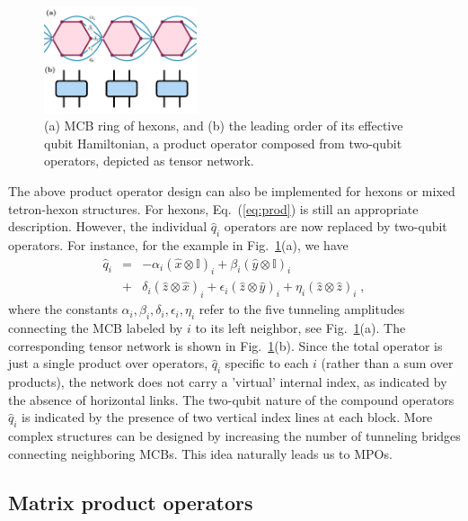 \documentclass[twocolumn,floats,prx,showpacs]{revtex4-1}
\newcommand{\id}{\mathbb{I}}
\def\id{\mathbb{I}}
\begin{document}
\begin{figure}
\includegraphics[width=0.4\textwidth]{fig/hexon_prod.pdf}
\caption{(a) MCB ring of hexons, and (b) the leading order of its effective qubit Hamiltonian, a product operator composed from two-qubit operators, depicted as tensor network.}
\label{fig:hexon_prod}
\end{figure}

The above product operator design can also be implemented for hexons or mixed tetron-hexon structures. For hexons, Eq.~(\ref{eq:prod}) is still an appropriate description. However, the individual $\hat q_i$ operators are now replaced by two-qubit operators. For instance, for the example in Fig.~\ref{fig:hexon_prod}(a), we have
\begin{eqnarray}
\hat q_i &=& -\alpha_i (\hat x \otimes \id)_i + 
\beta_i (\hat y \otimes \id)_i \nonumber \\
&+& \delta_i (\hat z \otimes \hat x)_i +\epsilon_i 
(\hat z \otimes \hat y )_i +\eta_i (\hat z \otimes \hat z)_i\;,
\end{eqnarray}
where the constants $\alpha_i,\beta_i,\delta_i,\epsilon_i,\eta_i$ refer to the five tunneling amplitudes connecting the MCB labeled by $i$ to its left neighbor, see Fig.~\ref{fig:hexon_prod}(a).
The corresponding tensor network is shown in Fig.~\ref{fig:hexon_prod}(b). Since the total operator is just a single product over operators, $\hat q_i$ specific to each $i$ (rather than a sum over products), the network does not carry a 'virtual' internal index, as indicated by the absence of  horizontal links. The two-qubit nature of the compound operators $\hat q_i$ is indicated by the presence of two vertical index lines at each block.   More complex structures can be designed by 
increasing the number of tunneling bridges connecting neighboring MCBs. 
This idea naturally leads us to MPOs.

\subsection{Matrix product operators}\label{sec3b}
\end{document}
